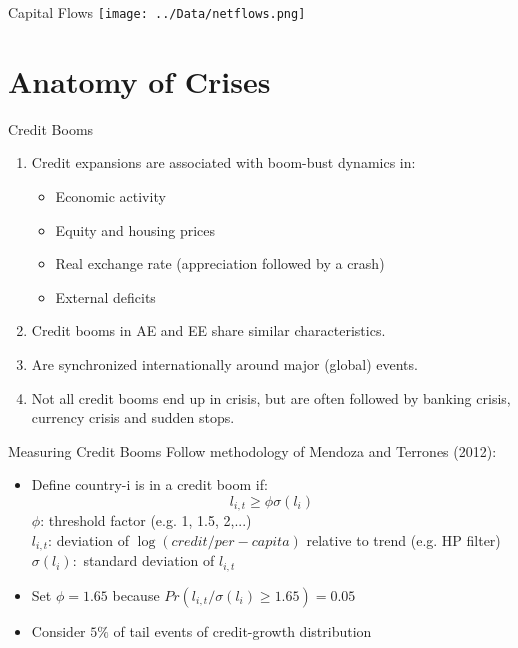 \documentclass{beamer}
\begin{document}
  \begin{frame}{Capital Flows}
  \centering
	\texttt{[image: ../Data/netflows.png]}
  \end{frame}
  
    \section{Anatomy of Crises}
  \begin{frame}{Credit Booms}

\begin{enumerate}
\item 	Credit expansions are associated with boom-bust dynamics in:
  \begin{itemize}
  \item Economic activity
  \item Equity and housing prices
  \item Real exchange rate (appreciation followed by a crash)
  \item External deficits
  \end{itemize}
\item  Credit booms in AE and EE share similar characteristics. 
\item  Are synchronized internationally around major (global) events. 
\item  Not all credit booms end up in crisis, but are often followed by banking crisis, currency crisis and sudden stops.  
\end{enumerate}
  
  \end{frame}

\begin{frame}{Measuring Credit Booms}
Follow methodology of Mendoza and Terrones (2012):
\begin{itemize}
\item Define country-i is in a credit boom if:
\begin{equation*}
l_{i,t} \geq \phi \sigma(l_i)
\end{equation*}
$\phi$: threshold factor (e.g. 1, 1.5, 2,...) \\
$l_{i,t}$: deviation of $\log(credit/per-capita)$ relative to trend (e.g. HP filter)\\
$\sigma(l_i):$ standard deviation of $l_{i,t}$
\item Set $\phi=1.65$ because $Pr(l_{i,t}/\sigma(l_i)\geq 1.65) = 0.05$
\item Consider $5\%$ of tail events of credit-growth distribution
\end{itemize}
\end{frame}
\end{document}

